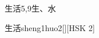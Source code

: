 \begin{entry}{生活}{5,9}{⽣、⽔}
  \begin{phonetics}{生活}{sheng1huo2}[][HSK 2]
  \end{phonetics}
\end{entry}
